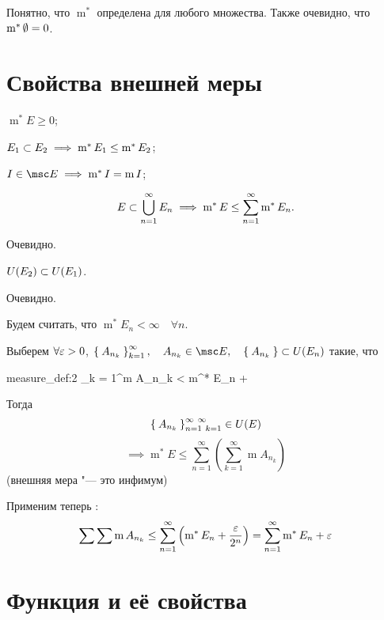 Понятно, что $ \operatorname m^* $ определена для любого множества. Также очевидно, что $ \operatorname m^* \emptyset = 0 $.

\section{Свойства внешней меры}

\begin{props}
	\item $ \operatorname m^* E \ge 0 $;
	\item $ E_1 \subset E_2 \implies \operatorname m^* E_1 \le \operatorname m^* E_2 $;
	\item $ I \in \msc E \implies \operatorname m^* I = \operatorname m I $;
	\item \label{en:outer_meas:4}
	$$ E \subset \bigcup_{n = 1}^\infty E_n \implies \operatorname m^* E \le \sum_{n = 1}^\infty \operatorname m^* E_n. $$
\end{props}

\begin{eproof}
	\item Очевидно.
	\item $ U(E_2) \subset U(E_1) $.
	\item Очевидно.
	\item Будем считать, что $ \operatorname m^* E_n < \infty \quad \forall n $.

	Выберем $ \forall \varepsilon > 0 $, $ \set{A_{n_k}}_{k = 1}^\infty, \quad A_{n_k} \in \msc E, \quad \set{A_{n_k}} \sub U(E_n) $ такие, что
	\begin{equ}{measure_def:2}
		\sum_{k = 1}^\infty \operatorname m A_{n_k} < \operatorname m^* E_n + \frac{}
	\end{equ}
	Тогда
	$$ \Set{A_{n_k}}_{n = 1~k = 1}^{\infty~\infty} \in U(E) $$
	$$ \implies \operatorname m^* E \le \sum_{n = 1}^\infty \left( \sum_{k = 1}^\infty \operatorname mA_{n_k} \right) $$
	(\as внешняя мера "--- это инфимум)

	Применим теперь :
	$$ \sum \sum \operatorname m A_{n_k} \le \sum_{n = 1}^\infty \left( \operatorname m^* E_n + \frac{\varepsilon}{2^n} \right) = \sum_{n = 1}^\infty \operatorname m^* E_n + \varepsilon $$
\end{eproof}

\section{Функция  и её свойства}

